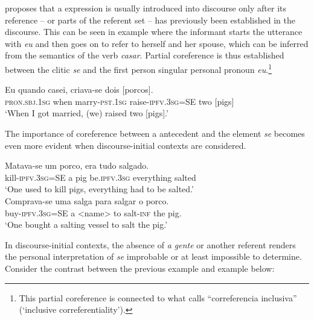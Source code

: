 \documentclass[output=paper]{langscibook}
\begin{document}
\citet{Cameron1995} proposes that a  expression is usually introduced into discourse only after its reference  -- or parts of the referent set --  has previously been established in the discourse. This can be seen in example  where the informant starts the utterance with \textit{eu} and then goes on to refer to herself and her spouse, which can be inferred from the semantics of the verb \textit{casar}. Partial coreference is thus established between the clitic \textit{se} and the first person singular personal pronoun \textit{eu}.\footnote{This partial coreference is connected to what \citet[522–524]{Gelbes2008} calls “correferencia inclusiva” (‘inclusive correferentiality’).}

\ea\label{ex:henriques:36}
 \gll Eu quando casei, criava-se dois [porcos].\\
         \textsc{pron.sbj.1sg} when marry-\textsc{pst.1sg} raise-\textsc{ipfv.3sg}=SE two [pigs]\\
 \glt `When I got married, (we) raised two [pigs].'
\z 

The importance of coreference between a  antecedent and the element \textit{se} becomes even more evident when discourse-initial contexts are considered. 

\ea\label{ex:henriques:37}
 \gll Matava-se um porco, era tudo salgado.\\
         kill-\textsc{ipfv.3sg}=SE a pig be.\textsc{ipfv.3sg} everything salted\\
 \glt `One used to kill pigs, everything had to be salted.'\\
 \gll Comprava-se uma salga para salgar o porco.\\
         buy-\textsc{ipfv.3sg}=SE a <name> to salt-\textsc{inf} the pig.\\
 \glt `One bought a salting vessel to salt the pig.'
\z 

In discourse-initial contexts, the absence of \textit{a gente} or another  referent renders the personal interpretation of \textit{se} improbable or at least impossible to determine. Consider the contrast between the previous example  and example  below:
\end{document}
